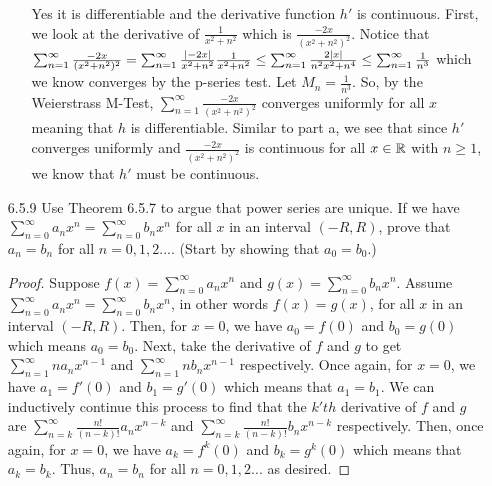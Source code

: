 \documentclass[12pt,letterpaper]{article}
\begin{document}
\begin{itemize}[leftmargin=!,labelindent=5pt]
\begin{itemize}
                    Yes it is differentiable and the derivative function $h'$ is continuous.
                    First, we look at the derivative of $\frac{1}{x^2 + n^2}$ which is $\frac{-2x}{(x^2 + n^2)^2}$.
                    Notice that $\sum_{n=1}^\infty \frac{-2x}{(x^2 + n^2)^2} = \sum_{n=1}^\infty \frac{\abs{-2x}}{x^2 + n^2} \frac{1}{x^2 + n^2} \leq \sum_{n=1}^\infty \frac{2\abs{x}}{n^2 x^2 + n^4} \leq \sum_{n=1}^\infty \frac{1}{n^3}$ which we know converges by the p-series test. 
                    Let $M_n = \frac{1}{n^3}$.
                    So, by the Weierstrass M-Test, $\sum_{n=1}^\infty \frac{-2x}{(x^2 + n^2)^2}$ converges uniformly for all $x$ meaning that $h$ is differentiable.
                    Similar to part a, we see that since $h'$ converges uniformly and $\frac{-2x}{(x^2 + n^2)^2}$ is continuous for all $x \in \mathbb{R}$ with $n \geq 1$, we know that $h'$ must be continuous.

            \end{itemize}
        \item [6.5.9] Use Theorem 6.5.7 to argue that power series are unique. If we have $\sum_{n=0}^{\infty} a_n x^n = \sum_{n=0}^{\infty} b_n x^n$ for all $x$ in an interval $(-R, R)$, prove that $a_n = b_n$ for all $n = 0,1,2 ... $. (Start by showing that $a_0 = b_0$.)
            \begin{proof}
                Suppose $f(x) = \sum_{n=0}^{\infty} a_n x^n$ and $g(x) = \sum_{n=0}^{\infty} b_n x^n$.
                Assume $\sum_{n=0}^{\infty} a_n x^n = \sum_{n=0}^{\infty} b_n x^n$, in other words $f(x) = g(x)$, for all $x$ in an interval $(-R, R)$.
                Then, for $x = 0$, we have $a_0 = f(0)$ and $b_0 = g(0)$ which means $a_0 = b_0$.
                Next, take the derivative of $f$ and $g$ to get $\sum_{n=1}^{\infty} na_n x^{n-1}$ and $\sum_{n=1}^{\infty} nb_n x^{n-1}$ respectively.
                Once again, for $x=0$, we have $a_1 = f'(0)$ and $b_1 = g'(0)$ which means that $a_1 = b_1$.
                We can inductively continue this process to find that the $k'th$ derivative of $f$ and $g$ are $\sum_{n=k}^\infty \frac{n!}{(n-k)!}a_n x^{n-k}$ and $\sum_{n=k}^\infty \frac{n!}{(n-k)!}b_n x^{n-k}$ respectively.
                Then, once again, for $x=0$, we have $a_k = f^k(0)$ and $b_k = g^k(0)$ which means that $a_k = b_k$.
                Thus, $a_n = b_n$ for all $n = 0,1,2 ... $ as desired.
            \end{proof}
    \end{itemize}
\end{document}
